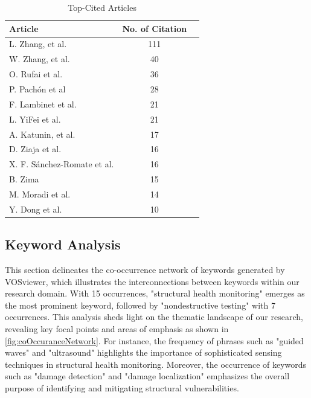 \documentclass[journal, a4paper]{IEEEtran}
\begin{document}
\begin{table}[htbp]

  \centering
  \caption{Top-Cited Articles}
  \label{tbl:articleCites}
  \begin{tabular}{lcc}

      \toprule
      \textbf{Article} & \textbf{No. of Citation} \\
      \midrule
      L. Zhang, et al. \cite{zhang_structural_2021} & 111 \\
      W. Zhang, et al. \cite{zhang_defect_2020} & 40 \\
      O. Rufai et al. \cite{rufai_cure_2020} & 36 \\
      P. Pachón et al \cite{pachon_evaluation_2020} & 28 \\
      F. Lambinet et al. \cite{lambinet_measurement_2022} & 21 \\
      L. YiFei et al. \cite{yifei_structure_2023} & 21 \\
      A. Katunin, et al. \cite{katunin_modeling_2021} & 17 \\
      D. Ziaja et al. \cite{ziaja_shm_2021} & 16 \\
      X. F. Sánchez-Romate et al. \cite{sanchez-romate_structural_2021} & 16 \\
      B. Zima \cite{zima_damage_2021} & 15 \\
      M. Moradi et al. \cite{moradi_intelligent_2023} & 14 \\
      Y. Dong et al. \cite{dong_ultrasonic_2022} & 10 \\

      \bottomrule
  \end{tabular}
\end{table}




\subsection{Keyword Analysis}
This section delineates the co-occurrence network of keywords generated by VOSviewer,
which illustrates the interconnections between keywords within our research domain.
With 15 occurrences, "structural health monitoring" emerges as the most prominent keyword, followed by
"nondestructive testing" with 7 occurrences. This analysis sheds light on the thematic landscape of our research,
revealing key focal points and areas of emphasis as shown in \autoref{fig:coOccuranceNetwork}.
For instance, the frequency of phrases such as
"guided waves" and "ultrasound" highlights the importance of sophisticated sensing techniques in structural
health monitoring. Moreover, the occurrence of keywords such as "damage detection" and "damage localization"
emphasizes the overall purpose of identifying and mitigating structural vulnerabilities.
\end{document}
